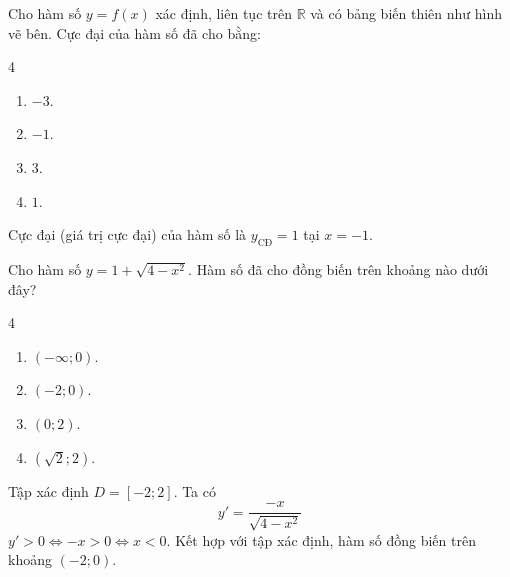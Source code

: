 \begin{baitap}
	Cho hàm số $y = f(x)$ xác định, liên tục trên $\mathbb{R}$ và có bảng biến thiên như hình vẽ bên. Cực đại của hàm số đã cho bằng:
	\begin{center}
	\end{center}
	\begin{multicols}{4}
		\begin{enumerate}
			\item $-3$.
			\item $-1$.
			\item $3$.
			\item $1$.
		\end{enumerate}
	\end{multicols}
	\begin{traloi}
		Cực đại (giá trị cực đại) của hàm số là $y_{\text{CĐ}} = 1$ tại $x = -1$.
	\end{traloi}
\end{baitap}

\begin{baitap}
	Cho hàm số $y = 1 + \sqrt{4 - x^2}$. Hàm số đã cho đồng biến trên khoảng nào dưới đây?
	\begin{multicols}{4}
		\begin{enumerate}
			\item $(-\infty; 0)$.
			\item $(-2; 0)$.
			\item $(0; 2)$.
			\item $(\sqrt{2}; 2)$.
		\end{enumerate}
	\end{multicols}
	\begin{traloi}
		\dapan{B}
		Tập xác định $D = [-2; 2]$.
		Ta có $$y' = \frac{-x}{\sqrt{4 - x^2}}$$
		$y' > 0 \Leftrightarrow -x > 0 \Leftrightarrow x < 0$.
		Kết hợp với tập xác định, hàm số đồng biến trên khoảng $(-2; 0)$.
	\end{traloi}
\end{baitap}

